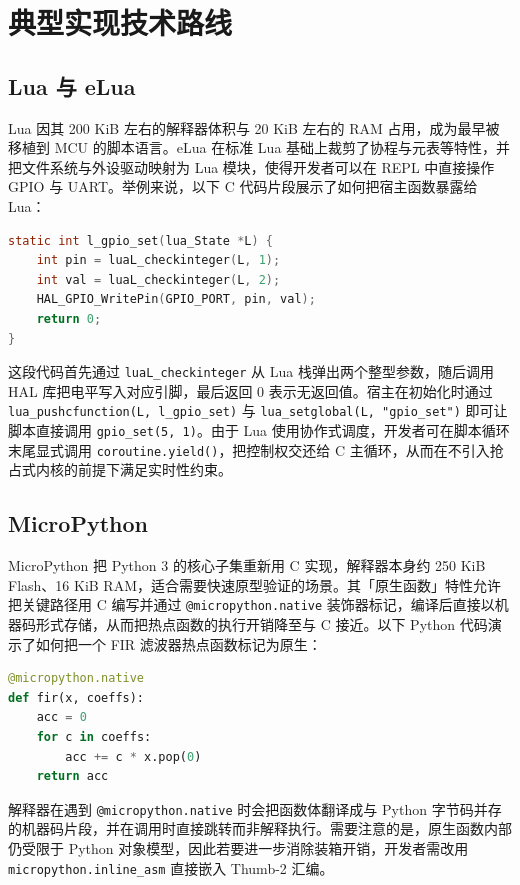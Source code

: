 \chapter{典型实现技术路线}
\section{Lua 与 eLua}
Lua 因其 200 KiB 左右的解释器体积与 20 KiB 左右的 RAM 占用，成为最早被移植到 MCU 的脚本语言。eLua 在标准 Lua 基础上裁剪了协程与元表等特性，并把文件系统与外设驱动映射为 Lua 模块，使得开发者可以在 REPL 中直接操作 GPIO 与 UART。举例来说，以下 C 代码片段展示了如何把宿主函数暴露给 Lua：\par
\begin{lstlisting}[language=c]
static int l_gpio_set(lua_State *L) {
    int pin = luaL_checkinteger(L, 1);
    int val = luaL_checkinteger(L, 2);
    HAL_GPIO_WritePin(GPIO_PORT, pin, val);
    return 0;
}
\end{lstlisting}
这段代码首先通过 \texttt{luaL\_{}checkinteger} 从 Lua 栈弹出两个整型参数，随后调用 HAL 库把电平写入对应引脚，最后返回 0 表示无返回值。宿主在初始化时通过 \texttt{lua\_{}pushcfunction(L, l\_{}gpio\_{}set)} 与 \texttt{lua\_{}setglobal(L, "gpio\_{}set")} 即可让脚本直接调用 \texttt{gpio\_{}set(5, 1)}。由于 Lua 使用协作式调度，开发者可在脚本循环末尾显式调用 \texttt{coroutine.yield()}，把控制权交还给 C 主循环，从而在不引入抢占式内核的前提下满足实时性约束。\par
\section{MicroPython}
MicroPython 把 Python 3 的核心子集重新用 C 实现，解释器本身约 250 KiB Flash、16 KiB RAM，适合需要快速原型验证的场景。其「原生函数」特性允许把关键路径用 C 编写并通过 \texttt{@micropython.native} 装饰器标记，编译后直接以机器码形式存储，从而把热点函数的执行开销降至与 C 接近。以下 Python 代码演示了如何把一个 FIR 滤波器热点函数标记为原生：\par
\begin{lstlisting}[language=python]
@micropython.native
def fir(x, coeffs):
    acc = 0
    for c in coeffs:
        acc += c * x.pop(0)
    return acc
\end{lstlisting}
解释器在遇到 \texttt{@micropython.native} 时会把函数体翻译成与 Python 字节码并存的机器码片段，并在调用时直接跳转而非解释执行。需要注意的是，原生函数内部仍受限于 Python 对象模型，因此若要进一步消除装箱开销，开发者需改用 \texttt{micropython.inline\_{}asm} 直接嵌入 Thumb-2 汇编。\par

